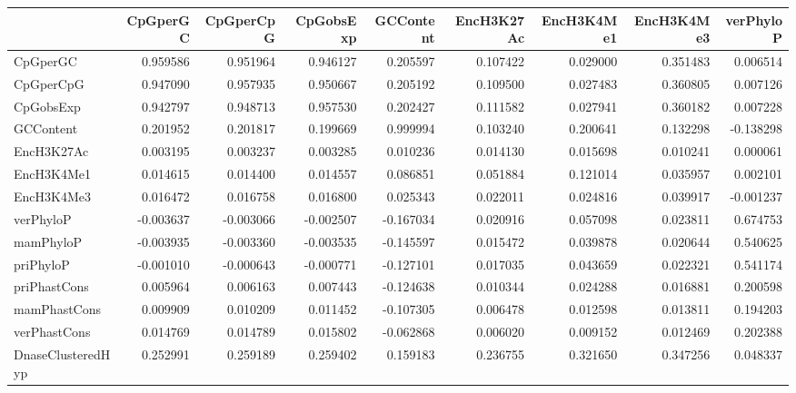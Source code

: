 \begin{tabular}{lrrrrrrrr}
\toprule
{} &  CpGperGC &  CpGperCpG &  CpGobsExp &  GCContent &  EncH3K27Ac &  EncH3K4Me1 &  EncH3K4Me3 &  verPhyloP \\
\midrule
CpGperGC            &  0.959586 &   0.951964 &   0.946127 &   0.205597 &    0.107422 &    0.029000 &    0.351483 &   0.006514 \\
CpGperCpG           &  0.947090 &   0.957935 &   0.950667 &   0.205192 &    0.109500 &    0.027483 &    0.360805 &   0.007126 \\
CpGobsExp           &  0.942797 &   0.948713 &   0.957530 &   0.202427 &    0.111582 &    0.027941 &    0.360182 &   0.007228 \\
GCContent           &  0.201952 &   0.201817 &   0.199669 &   0.999994 &    0.103240 &    0.200641 &    0.132298 &  -0.138298 \\
EncH3K27Ac          &  0.003195 &   0.003237 &   0.003285 &   0.010236 &    0.014130 &    0.015698 &    0.010241 &   0.000061 \\
EncH3K4Me1          &  0.014615 &   0.014400 &   0.014557 &   0.086851 &    0.051884 &    0.121014 &    0.035957 &   0.002101 \\
EncH3K4Me3          &  0.016472 &   0.016758 &   0.016800 &   0.025343 &    0.022011 &    0.024816 &    0.039917 &  -0.001237 \\
verPhyloP           & -0.003637 &  -0.003066 &  -0.002507 &  -0.167034 &    0.020916 &    0.057098 &    0.023811 &   0.674753 \\
mamPhyloP           & -0.003935 &  -0.003360 &  -0.003535 &  -0.145597 &    0.015472 &    0.039878 &    0.020644 &   0.540625 \\
priPhyloP           & -0.001010 &  -0.000643 &  -0.000771 &  -0.127101 &    0.017035 &    0.043659 &    0.022321 &   0.541174 \\
priPhastCons        &  0.005964 &   0.006163 &   0.007443 &  -0.124638 &    0.010344 &    0.024288 &    0.016881 &   0.200598 \\
mamPhastCons        &  0.009909 &   0.010209 &   0.011452 &  -0.107305 &    0.006478 &    0.012598 &    0.013811 &   0.194203 \\
verPhastCons        &  0.014769 &   0.014789 &   0.015802 &  -0.062868 &    0.006020 &    0.009152 &    0.012469 &   0.202388 \\
DnaseClusteredHyp   &  0.252991 &   0.259189 &   0.259402 &   0.159183 &    0.236755 &    0.321650 &    0.347256 &   0.048337 \\

\end{tabular}
